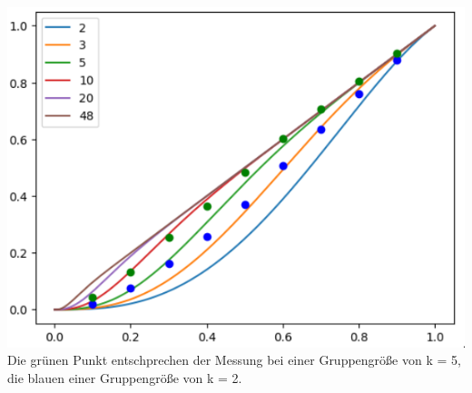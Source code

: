 \documentclass{article}
\begin{document}
        \includegraphics[width=1\textwidth,scale=0.5]{11-01-2023-23:03:16.png}
        Die grünen Punkt entschprechen der Messung bei einer Gruppengröße von k = 5, die blauen einer Gruppengröße von k = 2.
\end{document}
